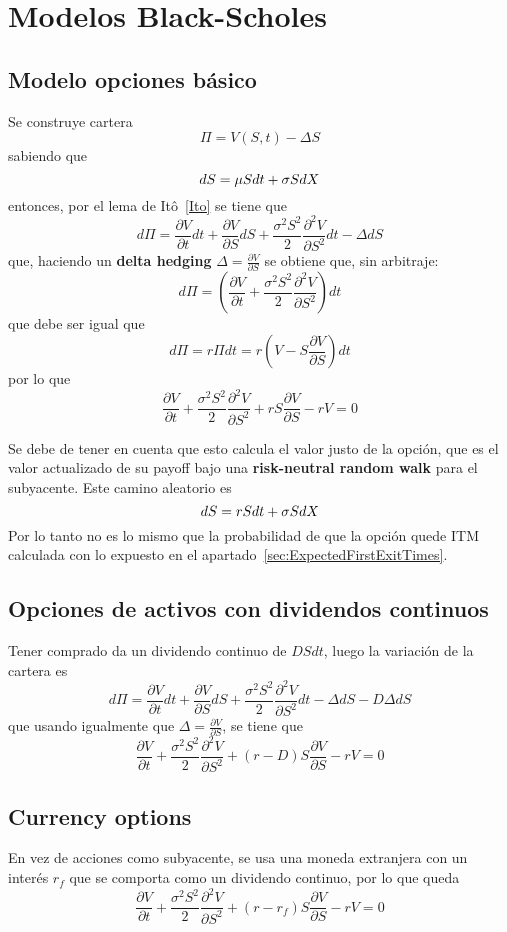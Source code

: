 
\section{Modelos Black-Scholes}




\subsection{Modelo opciones básico}
Se construye cartera
\[
\Pi = V(S,t) - \Delta S
\]
sabiendo que
\[
dS = \mu Sdt + \sigma S d\mathnormal{X}
\]
entonces, por el lema de Itô~\ref{Ito} se tiene que
\[
d\Pi = \frac{\partial V}{\partial t}dt + \frac{\partial V}{\partial S}dS + \frac{\sigma^2S^2}{2} \frac{\partial^2 V}{\partial S^2}dt - \Delta dS
\]
que, haciendo un \textbf{delta hedging} $\Delta = \frac{\partial V}{\partial S}$ se obtiene que, sin arbitraje:
\[
d\Pi = \left( \frac{\partial V}{\partial t} + \frac{\sigma^2S^2}{2} \frac{\partial^2 V}{\partial S^2} \right)dt
\]
que debe ser igual que
\[
d\Pi = r\Pi dt = r\left( V - S \frac{\partial V}{\partial S} \right)dt
\]
por lo que
\[
\boxed{\frac{\partial V}{\partial t} + \frac{\sigma^2S^2}{2} \frac{\partial^2 V}{\partial S^2} + rS \frac{\partial V}{\partial S} -rV = 0}
\]

Se debe de tener en cuenta que esto calcula el valor justo de la opción, que es el valor actualizado de su payoff bajo una \textbf{risk-neutral random walk} para el subyacente. Este camino aleatorio es
\[
    dS = rSdt + \sigma S d\mathnormal{X}
\]
Por lo tanto no es lo mismo que la probabilidad de que la opción quede ITM calculada con lo expuesto en el apartado~\ref{sec:ExpectedFirstExitTimes}.


\subsection{Opciones de activos con dividendos continuos}
Tener comprado da un dividendo continuo de $DSdt$, luego la variación de la cartera es
\[
d\Pi = \frac{\partial V}{\partial t}dt + \frac{\partial V}{\partial S}dS + \frac{\sigma^2S^2}{2} \frac{\partial^2 V}{\partial S^2}dt - \Delta dS - D\Delta dS
\]
que usando igualmente que $\Delta = \frac{\partial V}{\partial S}$, se tiene que
\[
\boxed{\frac{\partial V}{\partial t} + \frac{\sigma^2S^2}{2} \frac{\partial^2 V}{\partial S^2} + (r-D)S \frac{\partial V}{\partial S} -rV = 0}
\]



\subsection{Currency options}
En vez de acciones como subyacente, se usa una moneda extranjera con un interés $r_f$ que se comporta como un dividendo continuo, por lo que queda
\[
\boxed{\frac{\partial V}{\partial t} + \frac{\sigma^2S^2}{2} \frac{\partial^2 V}{\partial S^2} + (r-r_f)S \frac{\partial V}{\partial S} -rV = 0}
\]




